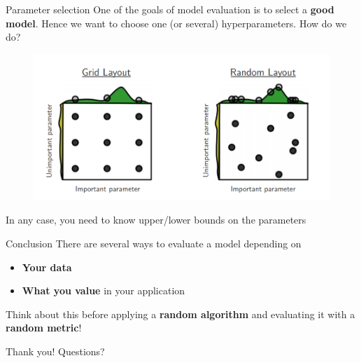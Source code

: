 \documentclass{beamer}
\begin{document}
\begin{frame}{Parameter selection}
One of the goals of model evaluation is to select a \textbf{good model}.
\vfill
\pause
Hence we want to choose one (or several) hyperparameters. How do we do?
\vfill
\pause
\begin{figure}
\centering
\includegraphics[width=\textwidth]{images/random_search.png}
\end{figure}
\pause
\vfill
In any case, you need to know upper/lower bounds on the parameters
\end{frame}

\begin{frame}{Conclusion}
There are several ways to evaluate a model depending on
\begin{itemize}
	\item \textbf{Your data}
	\item \textbf{What you value} in your application
\end{itemize}
\vfill
\pause
Think about this before applying a \textbf{random algorithm} and evaluating it with a \textbf{random metric}!
\end{frame}

\begin{frame}
	\center
	\huge{Thank you! Questions?}
\end{frame}
\end{document}
